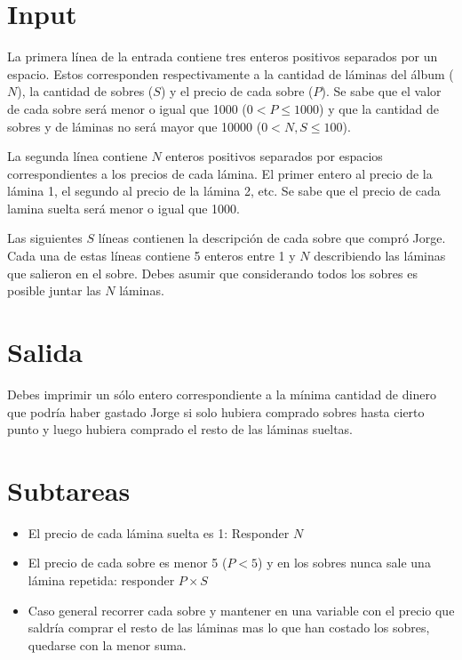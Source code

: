 \documentclass{article}
\begin{document}
\section*{Input}

La primera línea de la entrada contiene tres enteros positivos separados por un
espacio. Estos corresponden respectivamente a la cantidad de láminas del álbum
($N$), la cantidad de sobres ($S$) y el precio de cada sobre ($P$). Se sabe que
el valor de cada sobre será menor o igual que 1000 ($0 < P\leq 1000$) y que la
cantidad de sobres y de láminas no será mayor que 10000 ($0 < N,S \leq 100$).

La segunda línea contiene $N$ enteros positivos separados por espacios
correspondientes a los precios de cada lámina. El primer entero al precio de la
lámina 1, el segundo al precio de la lámina 2, etc. Se sabe que el precio de
cada lamina suelta será menor o igual que 1000.

Las siguientes $S$ líneas contienen la descripción de cada sobre que compró
Jorge. Cada una de estas líneas contiene 5 enteros entre 1 y $N$ describiendo
las láminas que salieron en el sobre. Debes asumir que considerando todos los
sobres es posible juntar las $N$ láminas. 

\section*{Salida}

Debes imprimir un sólo entero correspondiente a la mínima cantidad de dinero que
podría haber gastado Jorge si solo hubiera comprado sobres hasta cierto punto y
luego hubiera comprado el resto de las láminas sueltas.

\section*{Subtareas}

\begin{itemize}
  \item El precio de cada lámina suelta es 1: Responder $N$
  \item El precio de cada sobre es menor 5 ($P<5$) y en los sobres nunca sale
    una lámina repetida: responder $P\times S$
  \item Caso general recorrer cada sobre y mantener en una variable con el precio que saldría comprar el resto de las láminas mas lo que han costado los sobres, quedarse con la menor suma.
\end{itemize}

 
\end{document}
